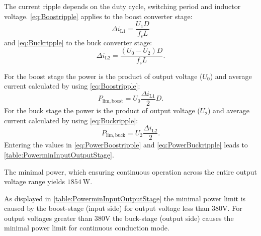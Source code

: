 
\begin{solutionblock}
    The current ripple depends on the duty cycle, switching period and inductor voltage.
    \eqref{eq:Boostripple} applies to the boost converter stage:
    \begin{equation}
        \Delta i_\mathrm{L1}=\frac{U_\mathrm{1}D}{f_\mathrm{s}L}
        \label{eq:Boostripple}
    \end{equation}
    and \eqref{eq:Buckripple} to the buck converter stage:
    \begin{equation}
        \Delta i_\mathrm{L2}=\frac{\left(U_\mathrm{0}-U_\mathrm{2}\right)D}{f_\mathrm{s}L}.
        \label{eq:Buckripple}
    \end{equation}
\end{solutionblock}


\begin{solutionblock}
    For the boost stage the power is the product of output voltage
     ($U_\mathrm{0}$) and average current calculated by using \eqref{eq:Boostripple}:
    \begin{equation}
        P_\mathrm{lim,boost}=U_\mathrm{0}\frac{\Delta i_\mathrm{L1}}{2}D.
        \label{eq:PowerBoostripple}
    \end{equation}
    For the buck stage the power is the product of output voltage
    ($U_\mathrm{2}$) and average current calculated by using \eqref{eq:Buckripple}:
    \begin{equation}
        P_\mathrm{lim,buck}=U_\mathrm{2}\frac{\Delta i_\mathrm{L2}}{2}.
        \label{eq:PowerBuckripple}
    \end{equation}
    Entering the values in \eqref{eq:PowerBoostripple} and \eqref{eq:PowerBuckripple} leads to \autoref{table:PowerminInputOutputStage}.
    
    The minimal power, which ensuring continuous operation across the entire output voltage range
    yields  $\SI{1854}{\watt}$.
\end{solutionblock}

\begin{solutionblock}
    As displayed in \autoref{table:PowerminInputOutputStage} the minimal power limit is caused by the 
    boost-stage (input side) for output voltage less than 380V. For output voltages greater than 380V 
    the buck-stage (output side) causes the minimal power limit for continuous conduction mode.
\end{solutionblock}

